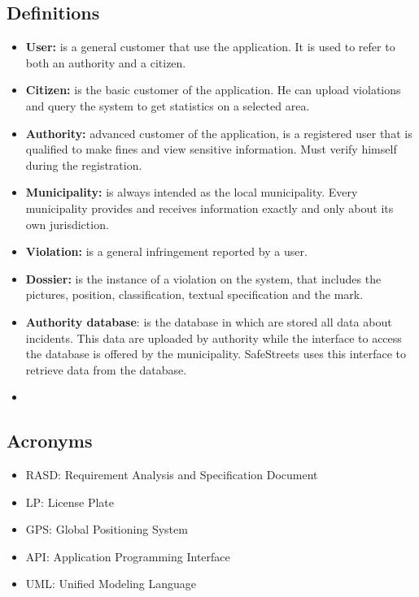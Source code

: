 \documentclass[../ITD.tex]{subfiles}
\begin{document}
    \subsection{Definitions}\label{subsec:definitions}
    \begin{itemize}
        \item \textbf{User:} is a general customer that use the application.
        It is used to refer to both an authority and a citizen.
        \item \textbf{Citizen:} is the basic customer of the application.
        He can upload violations and query the system to get statistics on a selected area.
        \item \textbf{Authority:} advanced customer of the application, is a registered user that is qualified to make fines and view sensitive information.
        Must verify himself during the registration.
        \item \textbf{Municipality:} is always intended as the local municipality.
        Every municipality provides and receives information exactly and only about its own jurisdiction.
        \item \textbf{Violation:} is a general infringement reported by a user.
        \item  \textbf{Dossier:} is the instance of a violation on the system, that includes the pictures, position, classification, textual specification and the mark.
        \item \textbf{Authority database}: is the database in which are stored all data about incidents.
        This data are uploaded by authority while the interface to access the database is offered by the municipality.
        SafeStreets uses this interface to retrieve data from the database.
        \item
    \end{itemize}

    \subsection{Acronyms}\label{subsec:acronyms}
    \begin{itemize}
        \item RASD: Requirement Analysis and Specification Document
        \item LP: License Plate
        \item GPS: Global Positioning System
        \item API: Application Programming Interface
        \item UML: Unified Modeling Language
    \end{itemize}
\end{document}
